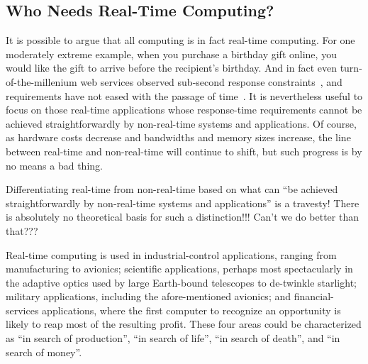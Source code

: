 \subsection{Who Needs Real-Time Computing?}
\label{sec:advsync:Who Needs Real-Time Computing?}

It is possible to argue that all computing is in fact real-time computing.
For one moderately extreme example, when you purchase a birthday gift online,
you would like the gift to arrive before the recipient's birthday.
And in fact even turn-of-the-millenium web services observed sub-second
response constraints~\cite{KristofferBohmann2001a}, and requirements have
not eased with the passage of time~\cite{DeCandia:2007:DAH:1323293.1294281}.
It is nevertheless useful to focus on those real-time applications
whose response-time requirements cannot be achieved straightforwardly
by non-real-time systems and applications.
Of course, as hardware costs decrease and bandwidths and memory sizes
increase, the line between real-time and non-real-time will continue
to shift, but such progress is by no means a bad thing.

\QuickQuiz{}
	Differentiating real-time from non-real-time based on what can
	``be achieved straightforwardly by non-real-time systems and
	applications'' is a travesty!
	There is absolutely no theoretical basis for such a distinction!!!
	Can't we do better than that???
 \QuickQuizEnd

Real-time computing is used in industrial-control applications, ranging from
manufacturing to avionics;
scientific applications, perhaps most spectacularly in the adaptive
optics used by
large Earth-bound telescopes to de-twinkle starlight;
military applications, including the afore-mentioned avionics;
and financial-services applications, where the first computer to recognize
an opportunity is likely to reap most of the resulting profit.
These four areas could be characterized as ``in search of production'',
``in search of life'', ``in search of death'', and ``in search of money''.

